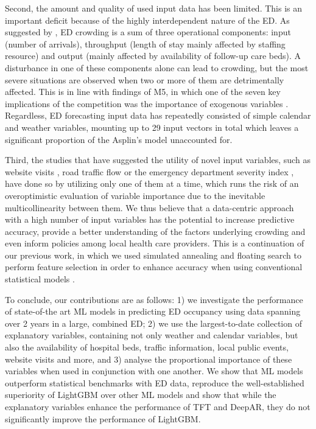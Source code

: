 Second, the amount and quality of used input data has been limited. This is an important deficit because of the highly interdependent nature of the ED. As suggested by \citet{Asplin2003}, ED crowding is a sum of three operational components: input (number of arrivals), throughput (length of stay mainly affected by staffing resource) and output (mainly affected by availability of follow-up care beds). A disturbance in one of these components alone can lead to crowding, but the most severe situations are observed when two or more of them are detrimentally affected. This is in line with findings of M5, in which one of the seven key implications of the competition was the importance of exogenous variables \cite{Makridakis2022}. Regardless, ED forecasting input data has repeatedly consisted of simple calendar and weather variables, mounting up to 29 input vectors in total \cite{Whitt2019, Holleman1996, Jiang2018} which leaves a significant proportion of the Asplin's model unaccounted for.

Third, the studies that have suggested the utility of novel input variables, such as website visits \cite{Ekstrom2015}, road traffic flow \cite{Rauch2019} or the emergency department severity index \cite{Cheng2021}, have done so by utilizing only one of them at a time, which runs the risk of an overoptimistic evaluation of variable importance due to the inevitable multicollinearity between them. We thus believe that a data-centric approach with a high number of input variables has the potential to increase predictive accuracy, provide a better understanding of the factors underlying crowding and even inform policies among local health care providers. This is a continuation of our previous work, in which we used simulated annealing and floating search to perform feature selection in order to enhance accuracy when using conventional statistical models \cite{Tuominen2022}.

To conclude, our contributions are as follows: 1) we investigate the performance of state-of-the art ML models in predicting ED occupancy using data spanning over 2 years in a large, combined ED; 2) we use the largest-to-date collection of explanatory variables, containing not only weather and calendar variables, but also the availability of hospital beds, traffic information, local public events, website visits and more, and 3) analyse the proportional importance of these variables when used in conjunction with one another. We show that ML models outperform statistical benchmarks with ED data, reproduce the well-established superiority of LightGBM over other ML models and show that while the explanatory variables enhance the performance of TFT and DeepAR, they do not significantly improve the performance of LightGBM.